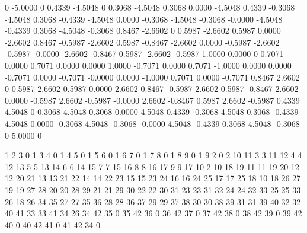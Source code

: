 \begin{minipage}[t]{0.48\textwidth}
 \begin{inputfile}[frame=single, caption={\opt{rr.dat} file created by \opt{tank.m}}, label={file:tank_rr}]
         0   -5.0000         0
    0.4339   -4.5048         0
    0.3068   -4.5048    0.3068
    0.0000   -4.5048    0.4339
   -0.3068   -4.5048    0.3068
   -0.4339   -4.5048    0.0000
   -0.3068   -4.5048   -0.3068
   -0.0000   -4.5048   -0.4339
    0.3068   -4.5048   -0.3068
    0.8467   -2.6602         0
    0.5987   -2.6602    0.5987
    0.0000   -2.6602    0.8467
   -0.5987   -2.6602    0.5987
   -0.8467   -2.6602    0.0000
   -0.5987   -2.6602   -0.5987
   -0.0000   -2.6602   -0.8467
    0.5987   -2.6602   -0.5987
    1.0000    0.0000         0
    0.7071    0.0000    0.7071
    0.0000    0.0000    1.0000
   -0.7071    0.0000    0.7071
   -1.0000    0.0000    0.0000
   -0.7071    0.0000   -0.7071
   -0.0000    0.0000   -1.0000
    0.7071    0.0000   -0.7071
    0.8467    2.6602         0
    0.5987    2.6602    0.5987
    0.0000    2.6602    0.8467
   -0.5987    2.6602    0.5987
   -0.8467    2.6602    0.0000
   -0.5987    2.6602   -0.5987
   -0.0000    2.6602   -0.8467
    0.5987    2.6602   -0.5987
    0.4339    4.5048         0
    0.3068    4.5048    0.3068
    0.0000    4.5048    0.4339
   -0.3068    4.5048    0.3068
   -0.4339    4.5048    0.0000
   -0.3068    4.5048   -0.3068
   -0.0000    4.5048   -0.4339
    0.3068    4.5048   -0.3068
         0    5.0000         0
 \end{inputfile}
\end{minipage} \hspace{10pt}
\begin{minipage}[t]{0.48\textwidth}
 \begin{inputfile}[frame=single, caption={\opt{ee.dat} file created by \opt{tank.m}}, label={file:tank_ee}]
     1     2     3     0
     1     3     4     0
     1     4     5     0
     1     5     6     0
     1     6     7     0
     1     7     8     0
     1     8     9     0
     1     9     2     0
     2    10    11     3
     3    11    12     4
     4    12    13     5
     5    13    14     6
     6    14    15     7
     7    15    16     8
     8    16    17     9
     9    17    10     2
    10    18    19    11
    11    19    20    12
    12    20    21    13
    13    21    22    14
    14    22    23    15
    15    23    24    16
    16    24    25    17
    17    25    18    10
    18    26    27    19
    19    27    28    20
    20    28    29    21
    21    29    30    22
    22    30    31    23
    23    31    32    24
    24    32    33    25
    25    33    26    18
    26    34    35    27
    27    35    36    28
    28    36    37    29
    29    37    38    30
    30    38    39    31
    31    39    40    32
    32    40    41    33
    33    41    34    26
    34    42    35     0
    35    42    36     0
    36    42    37     0
    37    42    38     0
    38    42    39     0
    39    42    40     0
    40    42    41     0
    41    42    34     0
 \end{inputfile}
\end{minipage} \hspace{10pt}




